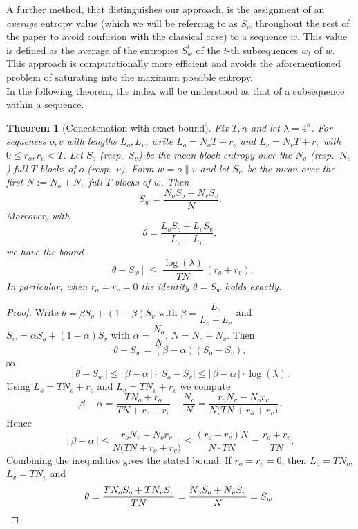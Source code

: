 \documentclass{article}
\newtheorem{Theorem}{Theorem}[section]
\theoremstyle{remark}
\begin{document}
A further method, that distinguishes our approach, is the assignment of an \emph{average} entropy value\cite{ref24}  (which we will be referring to as \(S_w\) throughout the rest of the paper to avoid confusion with the classical case) to a sequence \(w\). This value is defined as the average of the entropies \(S^t_w\) of the \(t\)-th subsequences \(w_t\) of \(w\). This approach is computationally more efficient and avoids the aforementioned problem of saturating into the maximum possible entropy.
\\

In the following theorem, the index will be understood as that of a subsequence within a sequence.

\begin{Theorem}[Concatenation with exact bound]
\label{thm:1}
Fix $T,n$ and let $\lambda=4^n$. For sequences $o,v$ with lengths
$L_o,L_v$, write $L_o=N_oT+r_o$ and $L_v=N_vT+r_v$ with $0\le r_o,r_v<T$.
Let $S_o$ (resp.\ $S_v$) be the mean block entropy over the $N_o$ (resp.\ $N_v$) full $T$-blocks of $o$ (resp.\ $v$).
Form $w=o\|v$ and let $S_w$ be the mean over the first $N:=N_o+N_v$ full $T$-blocks of $w$.
Then
\begin{equation}
S_w=\frac{N_oS_o+N_vS_v}{N}.
\end{equation}
Moreover, with
\begin{equation}
\theta=\frac{L_oS_o+L_vS_v}{L_o+L_v},
\end{equation}
we have the bound
\begin{equation}
\bigl|\,\theta-S_w\,\bigr|\;\le\;\frac{\log(\lambda)}{TN}\,(r_o+r_v).
\end{equation}
In particular, when $r_o=r_v=0$ the identity $\theta=S_w$ holds exactly.
\end{Theorem}

\begin{proof}
Write $\theta=\beta S_o+(1-\beta)S_v$ with $\beta=\dfrac{L_o}{L_o+L_v}$ and
$S_w=\alpha S_o+(1-\alpha)S_v$ with $\alpha=\dfrac{N_o}{N}$, $N=N_o+N_v$.
Then
\begin{equation}
\theta-S_w=(\beta-\alpha)(S_o-S_v),
\end{equation}
so
\begin{equation}
\bigl|\,\theta-S_w\,\bigr|\le |\,\beta-\alpha\,|\cdot\bigl|S_o-S_v\bigr|\le |\,\beta-\alpha\,|\cdot\log(\lambda).
\end{equation}
Using $L_o=TN_o+r_o$ and $L_v=TN_v+r_v$ we compute
\begin{equation}
\beta-\alpha
=\frac{TN_o+r_o}{TN+r_o+r_v}-\frac{N_o}{N}
=\frac{r_oN_v-N_or_v}{N\bigl(TN+r_o+r_v\bigr)}.
\end{equation}
Hence
\begin{equation}
|\,\beta-\alpha\,|
\le \frac{r_oN_v+N_or_v}{N\bigl(TN+r_o+r_v\bigr)}
\le \frac{(r_o+r_v)N}{N\cdot TN}
=\frac{r_o+r_v}{TN}.
\end{equation}
Combining the inequalities gives the stated bound. If $r_o=r_v=0$, then $L_o=TN_o$, $L_v=TN_v$ and
\begin{equation}
\theta=\frac{TN_oS_o+TN_vS_v}{TN}=\frac{N_oS_o+N_vS_v}{N}=S_w.\qedhere
\end{equation}
\end{proof}
\end{document}

